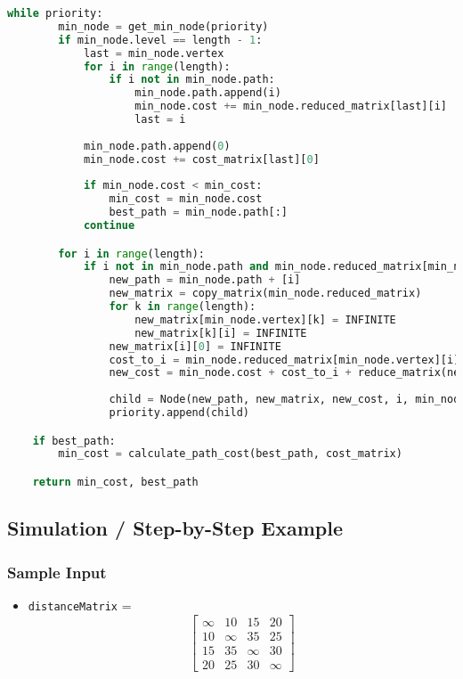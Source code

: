 \documentclass{article}
\begin{document}
\begin{lstlisting}[language=Python]
    while priority:
        min_node = get_min_node(priority)
        if min_node.level == length - 1:
            last = min_node.vertex
            for i in range(length):
                if i not in min_node.path:
                    min_node.path.append(i)
                    min_node.cost += min_node.reduced_matrix[last][i]
                    last = i
            
            min_node.path.append(0)
            min_node.cost += cost_matrix[last][0]
            
            if min_node.cost < min_cost:
                min_cost = min_node.cost
                best_path = min_node.path[:]
            continue

        for i in range(length):
            if i not in min_node.path and min_node.reduced_matrix[min_node.vertex][i] != INFINITE:
                new_path = min_node.path + [i]
                new_matrix = copy_matrix(min_node.reduced_matrix)
                for k in range(length):
                    new_matrix[min_node.vertex][k] = INFINITE
                    new_matrix[k][i] = INFINITE
                new_matrix[i][0] = INFINITE
                cost_to_i = min_node.reduced_matrix[min_node.vertex][i]
                new_cost = min_node.cost + cost_to_i + reduce_matrix(new_matrix)
                
                child = Node(new_path, new_matrix, new_cost, i, min_node.level + 1)
                priority.append(child)

    if best_path:
        min_cost = calculate_path_cost(best_path, cost_matrix)

    return min_cost, best_path
\end{lstlisting}

\subsection*{Simulation / Step-by-Step Example}
\subsubsection*{Sample Input}
\begin{itemize}
    \item \texttt{distanceMatrix} =
    \[
    \begin{bmatrix}
    \infty & 10 & 15 & 20 \\
    10 & \infty & 35 & 25 \\
    15 & 35 & \infty & 30 \\
    20 & 25 & 30 & \infty
    \end{bmatrix}
    \]
\end{itemize}
\end{document}
